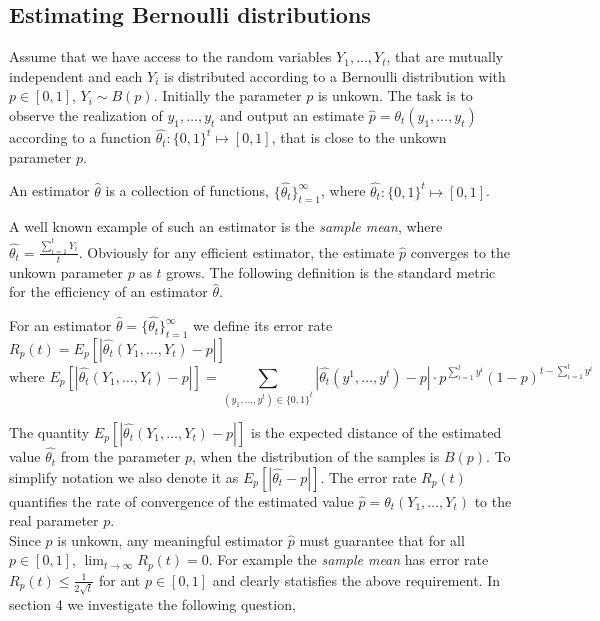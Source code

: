 
\subsection{Estimating Bernoulli distributions}

Assume that we have access to the random variables $Y_1,\ldots,Y_t$, that are
mutually independent and each
$Y_i$ is distributed according to a Bernoulli distribution with $p \in [0,1]$,
$Y_i\sim B(p)$.  Initially the parameter $p$ is unkown. The task is to observe
the realization of $y_1,\ldots,y_t$ and output an estimate
$\hat{p}=\theta_t(y_1,\ldots,y_t)$ according to a function $\hat{\theta_t}:
\{0,1\}^t\mapsto [0,1]$, that is close to the unkown parameter $p$.

\begin{definition}
  An estimator $\hat{\theta}$ is a collection of functions,
  $\{\hat{\theta_t}\}_{t=1}^{\infty}$, where
  $\hat{\theta_t}: \{0,1\}^t\mapsto [0,1]$.
\end{definition}

A well known example of such an estimator is the
\emph{sample mean}, where $\hat{\theta_t}=\frac{\sum_{i=1}^tY_i}{t}$.
\noindent Obviously for any efficient estimator, the estimate $\hat{p}$
converges to the unkown parameter $p$ as $t$ grows. The following definition is
the standard metric for the efficiency of an estimator $\hat{\theta}$.

\begin{definition}
  For an estimator $\hat{\theta}
  =\{\hat{\theta_t}\}_{t=1}^\infty$ we define its  error rate $R_p(t) =
  E_p[|\hat{\theta_t}(Y_1,\ldots,Y_t) - p|]$ \[\text{where
    }E_p[|\hat{\theta_t}(Y_1,\ldots,Y_t) - p|]= \sum_{(y_1,\ldots,y^t)\in
      \{0,1\}^t}|\hat{\theta_t}(y^1,\ldots,y^t) -p| \cdot
    p^{\sum_{i=1}^ty^i}(1-p)^{t-\sum_{i=1}^ty^i}\]
\end{definition}

The quantity $E_p[|\hat{\theta_t}(Y_1,\ldots,Y_t) - p|]$ is the expected distance
of the estimated value $\hat{\theta_t}$ from the parameter $p$, when the
distribution of the samples is $B(p)$. To simplify notation we also denote it
as $E_p[|\hat{\theta_t} - p|]$. The error rate $R_p(t)$ quantifies the rate of
convergence of the estimated value $\hat{p} =\theta_t(Y_1,\ldots,Y_t)$ to the
real parameter $p$. \\ Since $p$ is unkown, any meaningful estimator $\hat{p}$
must guarantee that for all $p \in [0,1]$, $\lim_{t \rightarrow \infty}
R_p(t)=0$. For example the \emph{sample mean} has error rate $R_p(t) \leq
\frac{1}{2\sqrt{t}}$ for ant $p \in [0,1]$ and clearly statisfies the above
requirement. In section 4 we investigate the following question,


